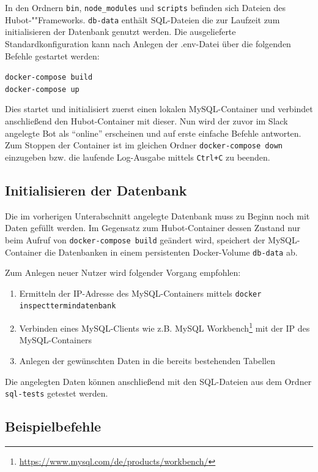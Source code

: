 In den Ordnern \texttt{bin}, \texttt{node\_modules} und \texttt{scripts} befinden sich Dateien des Hubot-""Frameworks. \texttt{db-data} enthält SQL-Dateien die zur Laufzeit zum initialisieren der Datenbank genutzt werden.
Die ausgelieferte Standardkonfiguration kann nach Anlegen der .env-Datei über die folgenden Befehle gestartet werden:

\texttt{docker-compose build}\\
\texttt{docker-compose up}

Dies startet und initialisiert zuerst einen lokalen MySQL-Container und verbindet anschließend den Hubot-Container mit dieser. Nun wird der zuvor im Slack angelegte Bot als \enquote{online} erscheinen und auf erste einfache Befehle antworten.
Zum Stoppen der Container ist im gleichen Ordner \texttt{docker-compose down} einzugeben bzw. die laufende Log-Ausgabe mittels \texttt{Ctrl+C} zu beenden.

\subsection{Initialisieren der Datenbank}
Die im vorherigen Unterabschnitt angelegte Datenbank muss zu Beginn noch mit Daten gefüllt werden. Im Gegensatz zum Hubot-Container dessen Zustand nur beim Aufruf von \texttt{docker-compose build} geändert wird, speichert der MySQL-Container die Datenbanken in einem persistenten Docker-Volume \texttt{db-data} ab.

Zum Anlegen neuer Nutzer wird folgender Vorgang empfohlen:

\begin{enumerate}
    \item Ermitteln der IP-Adresse des MySQL-Containers mittels \texttt{docker inspect\linebreak termindatenbank}
    \item Verbinden eines MySQL-Clients wie z.B. MySQL Workbench\footnote{\url{https://www.mysql.com/de/products/workbench/}} mit der IP des MySQL-Containers
    \item Anlegen der gewünschten Daten in die bereits bestehenden Tabellen
\end{enumerate}

Die angelegten Daten können anschließend mit den SQL-Dateien aus dem Ordner \linebreak\texttt{sql-tests} getestet werden.

\subsection{Beispielbefehle}


